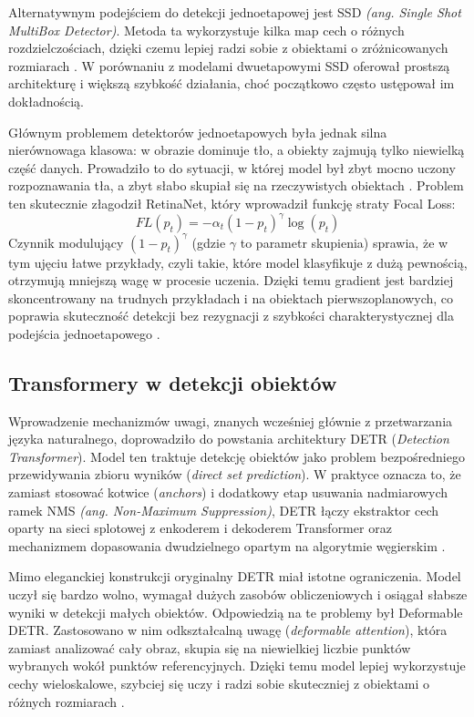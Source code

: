 Alternatywnym podejściem do detekcji jednoetapowej jest SSD \textit{(ang. Single Shot MultiBox
  Detector)}. Metoda ta wykorzystuje kilka map cech o różnych rozdzielczościach, dzięki czemu lepiej
radzi sobie z obiektami o zróżnicowanych rozmiarach \cite{liu2016ssd}. W porównaniu z modelami
dwuetapowymi SSD oferował prostszą architekturę i większą szybkość działania, choć początkowo
często ustępował im dokładnością.

Głównym problemem detektorów jednoetapowych była jednak silna nierównowaga klasowa: w obrazie
dominuje tło, a obiekty zajmują tylko niewielką część danych. Prowadziło to do sytuacji, w której
model był zbyt mocno uczony rozpoznawania tła, a zbyt słabo skupiał się na rzeczywistych obiektach
\cite{lin2017focal}. Problem ten skutecznie złagodził RetinaNet, który wprowadził funkcję straty
Focal Loss:
\[
  FL(p_t)=-\alpha_t(1-p_t)^\gamma\log(p_t)
\]
Czynnik modulujący $(1 - p_t)^\gamma$ (gdzie $\gamma$ to parametr skupienia) sprawia, że w tym
ujęciu łatwe przykłady, czyli takie, które model klasyfikuje z dużą pewnością, otrzymują mniejszą
wagę w procesie uczenia. Dzięki temu gradient jest bardziej skoncentrowany na trudnych przykładach
i na obiektach pierwszoplanowych, co poprawia skuteczność detekcji bez rezygnacji z szybkości
charakterystycznej dla podejścia jednoetapowego \cite{lin2017focal}.

\subsection{Transformery w detekcji obiektów}

Wprowadzenie mechanizmów uwagi, znanych wcześniej głównie z przetwarzania języka naturalnego,
doprowadziło do powstania architektury DETR (\textit{Detection Transformer}). Model ten traktuje
detekcję obiektów jako problem bezpośredniego przewidywania zbioru wyników (\textit{direct set
  prediction}). W praktyce oznacza to, że zamiast stosować kotwice (\textit{anchors}) i dodatkowy
etap usuwania nadmiarowych ramek NMS \textit{(ang. Non-Maximum Suppression)}, DETR łączy ekstraktor
cech oparty na sieci splotowej z enkoderem i dekoderem Transformer oraz mechanizmem dopasowania
dwudzielnego opartym na algorytmie węgierskim \cite{carion2020end}.

Mimo eleganckiej konstrukcji oryginalny DETR miał istotne ograniczenia. Model uczył się bardzo
wolno, wymagał dużych zasobów obliczeniowych i osiągał słabsze wyniki w detekcji małych obiektów.
Odpowiedzią na te problemy był Deformable DETR. Zastosowano w nim odkształcalną uwagę
(\textit{deformable attention}), która zamiast analizować cały obraz, skupia się na niewielkiej
liczbie punktów wybranych wokół punktów referencyjnych. Dzięki temu model lepiej wykorzystuje cechy
wieloskalowe, szybciej się uczy i radzi sobie skuteczniej z obiektami o różnych rozmiarach
\cite{zhu2021deformable}.

